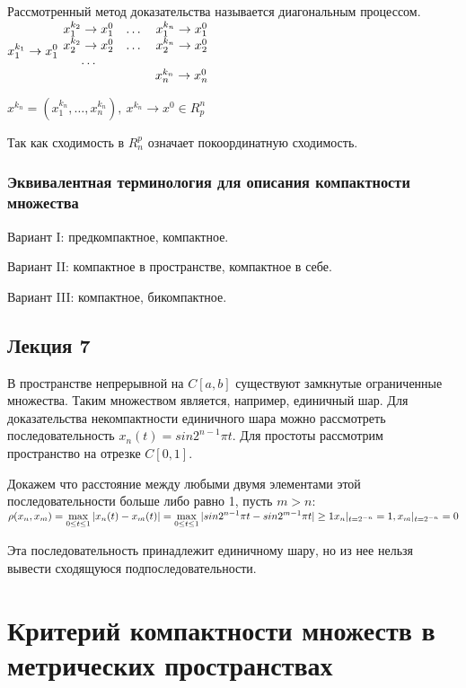 \documentclass[12pt]{report}
\renewcommand{\[}{$\\\displaystyle}
\renewcommand{\]}{\\$}
\renewcommand{\[}{$\\\displaystyle}
\newcommand{\sep}{,\ }
\begin{document}
Рассмотренный метод доказательства называется диагональным процессом.
\[ x_1^{k_1} \rightarrow x_1^0 \]
\[
\begin{matrix}
x_1^{k_2} \rightarrow x_1^0 & \dots & x_1^{k_n} \rightarrow x_1^0 \\
x_2^{k_2} \rightarrow x_2^0 & \dots & x_2^{k_n} \rightarrow x_2^0 \\
\dots\\
& & x_n^{k_n} \rightarrow x_n^0 \\
\end{matrix}
\]

$x^{k_n}=(x_1^{k_n},\dots,x_n^{k_n})\sep x^{k_n}\rightarrow x^0 \in R_p^n$

Так как сходимость в $R_n^p$ означает покоординатную сходимость.

\subsubsection{Эквивалентная терминология для описания компактности множества}

Вариант I: предкомпактное, компактное.

Вариант II: компактное в пространстве, компактное в себе.

Вариант III: компактное, бикомпактное.

\subsection{Лекция 7}

В пространстве непрерывной на $C[a,b]$ существуют замкнутые ограниченные множества. Таким множеством является, например, единичный шар. Для доказательства некомпактности единичного шара можно рассмотреть последовательность $x_n(t)=sin2^{n-1}\pi t$. Для простоты рассмотрим пространство на отрезке $C[0,1]$.

Докажем что расстояние между любыми двумя элементами этой последовательности больше либо равно 1, пусть $m>n$:
\[
\rho(x_n,x_m) = \max_{0\leq t \leq 1} |x_n(t)-x_m(t)| = \max_{0\leq t \leq 1} |sin 2^{n-1}\pi t-sin 2^{m-1}\pi t|\geq 1\\
x_n|_{t=2^{-n}}=1, x_m|_{t=2^{-n}}=0
\]

Эта последовательность принадлежит единичному шару, но из нее нельзя вывести сходящуюся подпоследовательности.

\section{Критерий компактности множеств в метрических пространствах}
\end{document}
